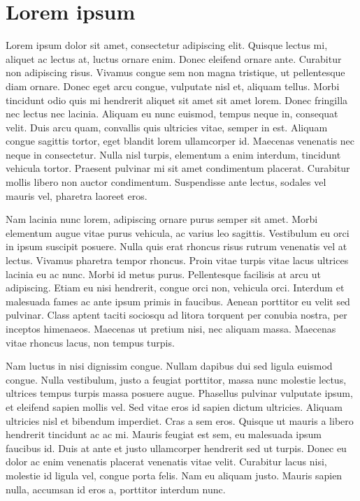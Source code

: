 
\section{Lorem ipsum}

Lorem ipsum dolor sit amet, consectetur adipiscing elit. Quisque lectus
mi, aliquet ac lectus at, luctus ornare enim. Donec eleifend ornare
ante. Curabitur non adipiscing risus. Vivamus congue sem non magna
tristique, ut pellentesque diam ornare. Donec eget arcu congue, vulputate
nisl et, aliquam tellus. Morbi tincidunt odio quis mi hendrerit aliquet
sit amet sit amet lorem. Donec fringilla nec lectus nec lacinia. Aliquam
eu nunc euismod, tempus neque in, consequat velit. Duis arcu quam,
convallis quis ultricies vitae, semper in est. Aliquam congue sagittis
tortor, eget blandit lorem ullamcorper id. Maecenas venenatis nec
neque in consectetur. Nulla nisl turpis, elementum a enim interdum,
tincidunt vehicula tortor. Praesent pulvinar mi sit amet condimentum
placerat. Curabitur mollis libero non auctor condimentum. Suspendisse
ante lectus, sodales vel mauris vel, pharetra laoreet eros.

Nam lacinia nunc lorem, adipiscing ornare purus semper sit amet. Morbi
elementum augue vitae purus vehicula, ac varius leo sagittis. Vestibulum
eu orci in ipsum suscipit posuere. Nulla quis erat rhoncus risus rutrum
venenatis vel at lectus. Vivamus pharetra tempor rhoncus. Proin vitae
turpis vitae lacus ultrices lacinia eu ac nunc. Morbi id metus purus.
Pellentesque facilisis at arcu ut adipiscing. Etiam eu nisi hendrerit,
congue orci non, vehicula orci. Interdum et malesuada fames ac ante
ipsum primis in faucibus. Aenean porttitor eu velit sed pulvinar.
Class aptent taciti sociosqu ad litora torquent per conubia nostra,
per inceptos himenaeos. Maecenas ut pretium nisi, nec aliquam massa.
Maecenas vitae rhoncus lacus, non tempus turpis.

Nam luctus in nisi dignissim congue. Nullam dapibus dui sed ligula
euismod congue. Nulla vestibulum, justo a feugiat porttitor, massa
nunc molestie lectus, ultrices tempus turpis massa posuere augue.
Phasellus pulvinar vulputate ipsum, et eleifend sapien mollis vel.
Sed vitae eros id sapien dictum ultricies. Aliquam ultricies nisl
et bibendum imperdiet. Cras a sem eros. Quisque ut mauris a libero
hendrerit tincidunt ac ac mi. Mauris feugiat est sem, eu malesuada
ipsum faucibus id. Duis at ante et justo ullamcorper hendrerit sed
ut turpis. Donec eu dolor ac enim venenatis placerat venenatis vitae
velit. Curabitur lacus nisi, molestie id ligula vel, congue porta
felis. Nam eu aliquam justo. Mauris sapien nulla, accumsan id eros
a, porttitor interdum nunc.

